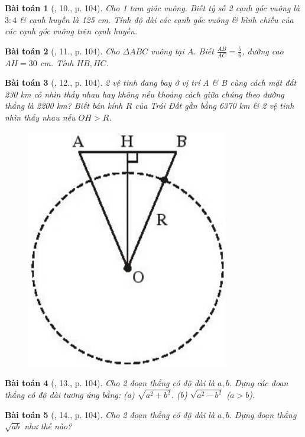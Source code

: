 \documentclass{article}
\newtheorem{baitoan}{Bài toán}
\begin{document}
\begin{baitoan}[\cite{SBT_Toan_9_tap_1}, 10., p. 104]
	Cho 1 tam giác vuông. Biết tỷ số 2 cạnh góc vuông là $3:4$ \& cạnh huyền là {\rm125 cm}. Tính độ dài các cạnh góc vuông \& hình chiếu của các cạnh góc vuông trên cạnh huyền.
\end{baitoan}

\begin{baitoan}[\cite{SBT_Toan_9_tap_1}, 11., p. 104]
	Cho $\Delta ABC$ vuông tại $A$. Biết $\frac{AB}{AC} = \frac{5}{6}$, đường cao $AH = 30$ {\rm cm}. Tính $HB,HC$.
\end{baitoan}

\begin{baitoan}[\cite{SBT_Toan_9_tap_1}, 12., p. 104]
	2 vệ tinh đang bay ở vị trí A \& B cùng cách mặt đất {\rm230 km} có nhìn thấy nhau hay không nếu khoảng cách giữa chúng theo đường thẳng là {\rm2200 km}? Biết bán kính $R$ của Trái Đất gần bằng {\rm6370 km} \& 2 vệ tinh nhìn thấy nhau nếu $OH > R$.
	\begin{figure}[H]
		\centering
		\includegraphics[scale=.25]{SBT_Toan_9_6_p104}
	\end{figure}
\end{baitoan}

\begin{baitoan}[\cite{SBT_Toan_9_tap_1}, 13., p. 104]
	Cho 2 đoạn thẳng có độ dài là $a,b$. Dựng các đoạn thẳng có độ dài tương ứng bằng: (a) $\sqrt{a^2 + b^2}$. (b) $\sqrt{a^2 - b^2}$ ($a > b$).
\end{baitoan}

\begin{baitoan}[\cite{SBT_Toan_9_tap_1}, 14., p. 104]
	Cho 2 đoạn thẳng có độ dài là $a,b$. Dựng đoạn thẳng $\sqrt{ab}$ như thế nào?
\end{baitoan}
\end{document}
